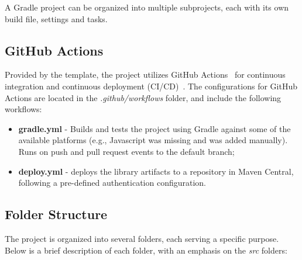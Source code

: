 A Gradle project can be organized into multiple subprojects, each with its own build file, settings and tasks.

\subsection{GitHub Actions}\label{subsec:github-actions}

Provided by the template, the project utilizes GitHub Actions~\cite{github-actions} for continuous integration and continuous deployment (CI/CD)~\cite{redhat-cicd}.
The configurations for GitHub Actions are located in the \textit{.github/workflows} folder, and include the following workflows:

\begin{itemize}
    \item \textbf{gradle.yml} - Builds and tests the project using Gradle against some of the available platforms (e.g., Javascript was missing and was added manually).
    Runs on push and pull request events to the default branch;
    \item \textbf{deploy.yml} - deploys the library artifacts to a repository in Maven Central, following a pre-defined authentication configuration.
\end{itemize}

\subsection{Folder Structure}\label{subsec:folder-structure}

The project is organized into several folders, each serving a specific purpose.
Below is a brief description of each folder, with an emphasis on the \textit{src} folders:

